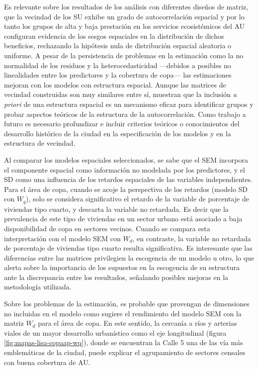 \documentclass[12pt,a4paper,oneside, openany]{book}
\theoremstyle{definition}
\theoremstyle{definition}
\theoremstyle{definition}
\theoremstyle{remark}
\begin{document}
Es relevante sobre los resultados de los análisis con diferentes diseños
de matriz, que la vecindad de los SU exhibe un grado de autocorrelación
espacial y por lo tanto los grupos de alta y baja prestación en los
servicios ecosistémicos del AU configuran evidencia de los sesgos
espaciales en la distribución de dichos beneficios, rechazando la
hipótesis nula de distribución espacial aleatoria o uniforme. A pesar de
la persistencia de problemas en la estimación como la no normalidad de
los residuos y la heterocedasticidad ---debidos a posibles no
linealidades entre los predictores y la cobertura de copa--- las
estimaciones mejoran con los modelos con estructura espacial. Aunque las
matrices de vecindad construidas son muy similares entre sí, muestran
que la inclusión \emph{a priori} de una estructura espacial es un
mecanismo eficaz para identificar grupos y probar aspectos teóricos de
la estructura de la autocorrelación. Como trabajo a futuro es necesario
profundizar e incluir criterios teóricos o conocimientos del desarrollo
histórico de la ciudad en la especificación de los modelos y en la
estructura de vecindad.

Al comparar los modelos espaciales seleccionados, se sabe que el SEM
incorpora el componente espacial como información no modelada por los
predictores, y el SD como una influencia de los retardos espaciales de
las variables independientes. Para el área de copa, cuando se acoje la
perspectiva de los retardos (modelo SD con \(W_q\)), solo se considera
significativo el retardo de la variable de porcentaje de viviendas tipo
cuarto, y descarta la variable no retardada. Es decir que la prevalencia
de este tipo de viviendas en un sector urbano está asociado a baja
disponibilidad de copa en sectores vecinos. Cuando se compara esta
interpretación con el modelo SEM con \(W_d\), en contraste, la variable
no retardada de porcentaje de viviendas tipo cuarto resulta
significativa. Es interesante que las diferencias entre las matrices
privilegien la escogencia de un modelo u otro, lo que alerta sobre la
importancia de los supuestos en la escogencia de su estructura ante la
discrepancia entre los resultados, señalando posibles mejoras en la
metodología utilizada.

Sobre los problemas de la estimación, es probable que provengan de
dimensiones no incluidas en el modelo como sugiere el rendimiento del
modelo SEM con la matriz \(W_d\) para el área de copa. En este sentido,
la cercanía a ríos y arterias viales de un mayor desarrollo urbanístico
como el eje longitudinal (figura \ref{fig:mapas-lisa-copaap-wq}), donde
se encuentran la Calle 5 una de las vía más emblemáticas de la ciudad,
puede explicar el agrupamiento de sectores censales con buena cobertura
de AU.
\end{document}
